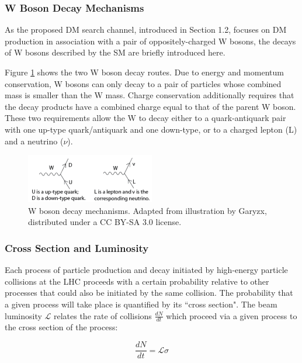 \documentclass[12pt]{article}
\begin{document}
\subsubsection{W Boson Decay Mechanisms}

As the proposed DM search channel, introduced in Section 1.2, focuses on DM production in association with a pair of oppositely-charged W bosons, the decays of W bosons described by the SM are briefly introduced here. 

Figure \ref{fig:W_decays} shows the two W boson decay routes. Due to energy and momentum conservation, W bosons can only decay to a pair of particles whose combined mass is smaller than the W mass. Charge conservation additionally requires that the decay products have a combined charge equal to that of the parent W boson. These two requirements allow the W to decay either to a quark-antiquark pair with one up-type quark/antiquark and one down-type, or to a charged lepton (L) and a neutrino ($\nu$).

\begin{figure}[H]
	\centering
	\includegraphics[width=0.5\textwidth]{figures/W_decays.png}
	\caption[]{W boson decay mechanisms. Adapted from illustration by Garyzx, distributed under a CC BY-SA 3.0 license.}
	\label{fig:W_decays}
\end{figure}

\subsubsection{Cross Section and Luminosity}

Each process of particle production and decay initiated by high-energy particle collisions at the LHC proceeds with a certain probability relative to other processes that could also be initiated by the same collision. The probability that a given process will take place is quantified by its ``cross section". The beam luminosity $\mathcal{L}$ relates the rate of collisions $\frac{dN}{dt}$ which proceed via a given process to the cross section of the process:

\begin{equation}
\frac{dN}{dt} = \mathcal{L}\sigma
\end{equation}
\end{document}

